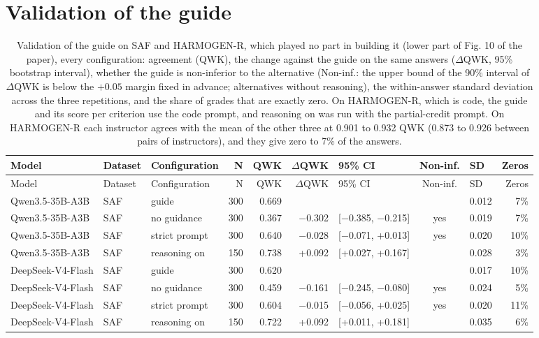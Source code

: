 \documentclass[10pt]{article}
\begin{document}
\section{Validation of the guide}
\begingroup\footnotesize
\begin{longtable}{ll>{\raggedright\arraybackslash}p{2.9cm}rrrlclr}
\caption{Validation of the guide on SAF and HARMOGEN-R, which played no part in building it (lower part of Fig. 10 of the paper), every configuration: agreement (QWK), the change against the guide on the same answers ($\Delta$QWK, 95\% bootstrap interval), whether the guide is non-inferior to the alternative (Non-inf.: the upper bound of the 90\% interval of $\Delta$QWK is below the $+0.05$ margin fixed in advance; alternatives without reasoning), the within-answer standard deviation across the three repetitions, and the share of grades that are exactly zero. On HARMOGEN-R, which is code, the guide and its score per criterion use the code prompt, and reasoning on was run with the partial-credit prompt. On HARMOGEN-R each instructor agrees with the mean of the other three at 0.901 to 0.932 QWK (0.873 to 0.926 between pairs of instructors), and they give zero to 7\% of the answers.}\\
\hline
Model & Dataset & Configuration & N & QWK & $\Delta$QWK & 95\% CI & Non-inf. & SD & Zeros \\ \hline
\endfirsthead
\hline
Model & Dataset & Configuration & N & QWK & $\Delta$QWK & 95\% CI & Non-inf. & SD & Zeros \\ \hline
\endhead
Qwen3.5-35B-A3B & SAF & guide & 300 & 0.669 &  &  &  & 0.012 & 7\% \\
Qwen3.5-35B-A3B & SAF & no guidance & 300 & 0.367 & $-$0.302 & [$-$0.385, $-$0.215] & yes & 0.019 & 7\% \\
Qwen3.5-35B-A3B & SAF & strict prompt & 300 & 0.640 & $-$0.028 & [$-$0.071, +0.013] & yes & 0.020 & 10\% \\
Qwen3.5-35B-A3B & SAF & reasoning on & 150 & 0.738 & +0.092 & [+0.027, +0.167] &  & 0.028 & 3\% \\
DeepSeek-V4-Flash & SAF & guide & 300 & 0.620 &  &  &  & 0.017 & 10\% \\
DeepSeek-V4-Flash & SAF & no guidance & 300 & 0.459 & $-$0.161 & [$-$0.245, $-$0.080] & yes & 0.024 & 5\% \\
DeepSeek-V4-Flash & SAF & strict prompt & 300 & 0.604 & $-$0.015 & [$-$0.056, +0.025] & yes & 0.020 & 11\% \\
DeepSeek-V4-Flash & SAF & reasoning on & 150 & 0.722 & +0.092 & [+0.011, +0.181] &  & 0.035 & 6\% \\

\end{longtable}
\end{document}
